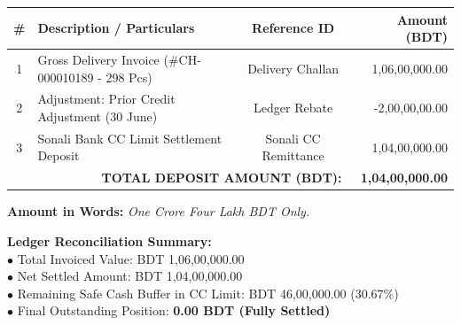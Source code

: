 \documentclass[11pt, a4paper]{article}
\begin{document}
\vspace{-4pt}

\begin{tcolorbox}[colback=white, colframe=bordergrey, title=\textbf{\color{darknavy}{2. DEPOSIT PARTICULARS \& INVOICE ADJUSTMENT}}, fonttitle=\bfseries, arc=3pt, left=8pt, right=8pt, top=6pt, bottom=6pt]
  \renewcommand{\arraystretch}{1.2}
  \begin{tabularx}{\textwidth}{@{} c X c r @{}}
    \hline
    \textbf{\# } & \textbf{Description / Particulars} & \textbf{Reference ID} & \textbf{Amount (BDT)} \\
    \hline
    1 & Gross Delivery Invoice (\#CH-000010189 - 298 Pcs) & Delivery Challan & 1,06,00,000.00 \\
    2 & Adjustment: Prior Credit Adjustment (30 June) & Ledger Rebate & -2,00,00,00.00 \\
    3 & Sonali Bank CC Limit Settlement Deposit & Sonali CC Remittance & 1,04,00,000.00 \\
    \hline
    \multicolumn{3}{r}{\textbf{TOTAL DEPOSIT AMOUNT (BDT):}} & \textbf{1,04,00,000.00} \\
    \hline
  \end{tabularx}

  \vspace{8pt}
  \textbf{Amount in Words:} \textit{One Crore Four Lakh BDT Only.}
\end{tcolorbox}

\vspace{-4pt}

\begin{tcolorbox}[colback=lightgrey, colframe=bordergrey, arc=3pt, left=8pt, right=8pt, top=6pt, bottom=6pt]
  \begin{minipage}{0.65\textwidth}
    \small
    \textbf{Ledger Reconciliation Summary:} \\
    $\bullet$ Total Invoiced Value: BDT 1,06,00,000.00 \\
    $\bullet$ Net Settled Amount: BDT 1,04,00,000.00 \\
    $\bullet$ Remaining Safe Cash Buffer in CC Limit: BDT 46,00,000.00 (30.67\%) \\
    $\bullet$ Final Outstanding Position: \textbf{0.00 BDT (Fully Settled)}
  \end{minipage} %
  \begin{minipage}{0.34\textwidth}
    \centering
  \end{minipage}
\end{tcolorbox}
\end{document}

